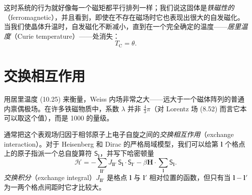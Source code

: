 
这时系统的行为就好像每一个磁矩都平行排列一样；我们说这固体是\emph{铁磁性的}（ferromagnetic），并且看到，即使在不存在磁场时它也表现出很大的自发磁化。当我们使晶体升温时，自发磁化不断减小，直到在一个完全确定的温度——\emph{居里温度}（Curie temperature）——处消失：
\begin{equation*}
T_{\mathrm{C}}=\theta.
\tag{10.28}
\end{equation*}

\section{交换相互作用}

用居里温度 (10.25) 来衡量，Weiss 内场非常之大——远大于一个磁体阵列的普通内禀偶极场。在许多铁磁物质中，系数 $\lambda$ 并非 $\frac{4}{3}\pi$（对 Lorentz 场 (8.52) 而言它本可以取这个值），而是 1000 的量级。

通常把这个表观场归因于相邻原子上电子自旋之间的\emph{交换相互作用}（exchange interaction）。对于 Heisenberg 和 Dirac 的严格局域模型，我们可以给第 $\boldsymbol{l}$ 个格点上的原子指派一个总自旋算符 $\boldsymbol{\mathsf{S}}_{\boldsymbol{l}}$，并写下哈密顿量
\begin{equation*}
\mathcal{H}=-\sum_{\boldsymbol{l}\boldsymbol{l}'}J_{\boldsymbol{l}\boldsymbol{l}'}\,\boldsymbol{\mathsf{S}}_{\boldsymbol{l}}\cdot\boldsymbol{\mathsf{S}}_{\boldsymbol{l}'}-\beta\mathbf{H}\cdot\sum_{\boldsymbol{l}}\boldsymbol{\mathsf{S}}_{\boldsymbol{l}}.
\tag{10.29}
\end{equation*}
\emph{交换积分}（exchange integral）$J_{\boldsymbol{l}\boldsymbol{l}'}$ 是格点 $\boldsymbol{l}$ 与 $\boldsymbol{l}'$ 相对位置的函数，但只有当 $\boldsymbol{l}-\boldsymbol{l}'$ 为一两个格点间距时它才比较大。

